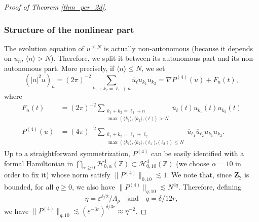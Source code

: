 \documentclass[JEP,XML,SOM,Unicode,NoEqCountersInSection,published]{cedram}
\theoremstyle{definition}
\begin{document}
\begin{proof}[Proof of Theorem \ref{thm_per_2d}]
\subsubsection*{Structure of the nonlinear part}
The evolution equation of $u^{\leq N}$ is actually non-autonomous (because it depends on $u_n$, $\langle n \rangle >N$). Therefore, we split it between its autonomous part and its non-autonomous part. More precisely, if $\langle n \rangle \leq N$, we set
\[
(|u|^2 u)_n = (2\pi)^{-2} \sum_{k_1+k_2=\ell_1+n} \overline{u}_{\ell} u_{k_1} u_{k_2} = \nabla P^{(4)}(u)+F_n(t),
\]
where
\begin{align*}
F_n(t) &= (2\pi)^{-2} \! \! \! \! \! \sum_{\substack{
k_1+k_2=\ell_1+n\\
\max(\langle k_1 \rangle, \langle k_2 \rangle,\langle \ell \rangle)>N}} \! \! \! \! \! \overline{u}_{\ell}(t) u_{k_1}(t) u_{k_2}(t)
\\
\tag*{and}
P^{(4)}(u) &= (4\pi)^{-2} \! \! \! \! \! \! \! \! \! \sum_{ \substack{k_1+k_2=\ell_1+\ell_2\\ \max(\langle k_1 \rangle, \langle k_2 \rangle,\langle \ell_1 \rangle,\langle \ell_2 \rangle)\leq N } } \! \! \! \! \! \overline{u}_{\ell_1} \overline{u}_{\ell_2} u_{k_1} u_{k_2}.
\end{align*}
Up to a straightforward symmetrization, $P^{(4)}$ can be easily identified with a formal Hamiltonian in $\bigcap_{\alpha\geq 0}\mathscr{H}_{0,\alpha}^{4}(\mathbb{Z}) \subset \mathscr{H}_{0,10}^{4}(\mathbb{Z}) $ (we choose $\alpha=10$ in order to fix it) whose norm satisfy $\|P^{(4)} \|_{0,10} \lesssim 1$. We note that, since $\mathbf{Z}_2$ is bounded, for all $q\geq 0$, we also have $\|P^{(4)} \|_{q,10} \lesssim N^{4q}$. Therefore, defining
\[
\eta = \varepsilon^{\delta/2}/\Lambda_\rho \quad \text{and} \quad q=\delta/12r,
\]
we have $\|P^{(4)} \|_{q,10} \lesssim (\varepsilon^{-3r})^{\delta/3r}\approx \eta^{-2}$.


\end{proof}
\end{document}

